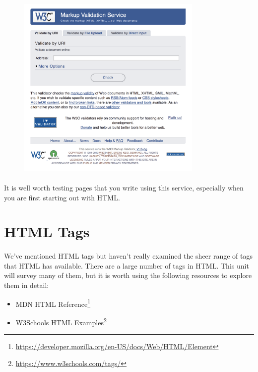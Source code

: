 \begin{figure}[H]
\centering
\includegraphics[width=0.8\textwidth]{figures/validation}
\label{fig:html-structure}
\end{figure}


\paragraph{} It is well worth testing pages that you write using this service, especially when you are first starting out with HTML.

\section{HTML Tags}
\paragraph{} We've mentioned HTML tags but haven't really examined the sheer range of tags that HTML has available. There are a large number of tags in HTML. This unit will survey many of them, but it is worth using the following resources to explore them in detail:
\begin{itemize}
\item MDN HTML Reference\footnote{\url{https://developer.mozilla.org/en-US/docs/Web/HTML/Element}}
\item W3Schools HTML Examples\footnote{\url{https://www.w3schools.com/tags/}}
\end{itemize}

